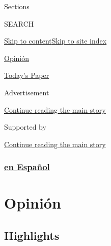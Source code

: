 Sections

SEARCH

\protect\hyperlink{site-content}{Skip to
content}\protect\hyperlink{site-index}{Skip to site index}

\href{https://www.nytimes3xbfgragh.onion/es/section/opinion}{Opinión}

\href{https://myaccount.nytimes3xbfgragh.onion/auth/login?response_type=cookie\&client_id=vi}{}

\href{https://www.nytimes3xbfgragh.onion/section/todayspaper}{Today's
Paper}

Advertisement

\protect\hyperlink{after-top}{Continue reading the main story}

Supported by

\protect\hyperlink{after-sponsor}{Continue reading the main story}

\hypertarget{en-espauxf1ol}{%
\subsubsection{\texorpdfstring{\href{/es/}{en
Español}}{en Español}}\label{en-espauxf1ol}}

\hypertarget{opiniuxf3n}{%
\section{Opinión}\label{opiniuxf3n}}

\hypertarget{highlights}{%
\subsection{Highlights}\label{highlights}}

